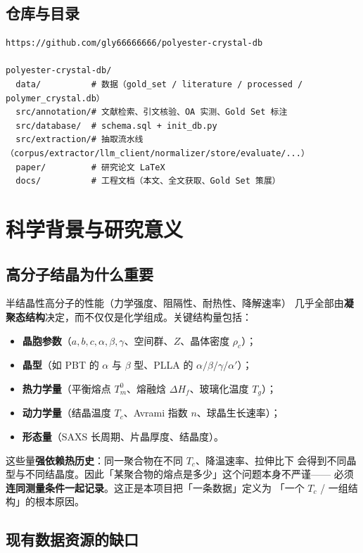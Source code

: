 \documentclass[11pt,a4paper]{ctexart}
\begin{document}
\subsection*{仓库与目录}
\begin{lstlisting}[style=common]
https://github.com/gly66666666/polyester-crystal-db

polyester-crystal-db/
  data/          # 数据（gold_set / literature / processed / polymer_crystal.db）
  src/annotation/# 文献检索、引文核验、OA 实测、Gold Set 标注
  src/database/  # schema.sql + init_db.py
  src/extraction/# 抽取流水线（corpus/extractor/llm_client/normalizer/store/evaluate/...）
  paper/         # 研究论文 LaTeX
  docs/          # 工程文档（本文、全文获取、Gold Set 策展）
\end{lstlisting}

\section{科学背景与研究意义}

\subsection{高分子结晶为什么重要}

半结晶性高分子的性能（力学强度、阻隔性、耐热性、降解速率）
几乎全部由\textbf{凝聚态结构}决定，而不仅仅是化学组成。关键结构量包括：
\begin{itemize}[leftmargin=1.2em]
  \item \textbf{晶胞参数}（$a,b,c,\alpha,\beta,\gamma$、空间群、$Z$、晶体密度 $\rho_c$）；
  \item \textbf{晶型}（如 PBT 的 $\alpha$ 与 $\beta$ 型、PLLA 的 $\alpha/\beta/\gamma/\alpha'$）；
  \item \textbf{热力学量}（平衡熔点 $T_m^0$、熔融焓 $\Delta H_f$、玻璃化温度 $T_g$）；
  \item \textbf{动力学量}（结晶温度 $T_c$、Avrami 指数 $n$、球晶生长速率）；
  \item \textbf{形态量}（SAXS 长周期、片晶厚度、结晶度）。
\end{itemize}
这些量\textbf{强依赖热历史}：同一聚合物在不同 $T_c$、降温速率、拉伸比下
会得到不同晶型与不同结晶度。因此「某聚合物的熔点是多少」这个问题本身不严谨——
必须\textbf{连同测量条件一起记录}。这正是本项目把「一条数据」定义为
「一个 $T_c$ / 一组结构」的根本原因。

\subsection{现有数据资源的缺口}
\end{document}
